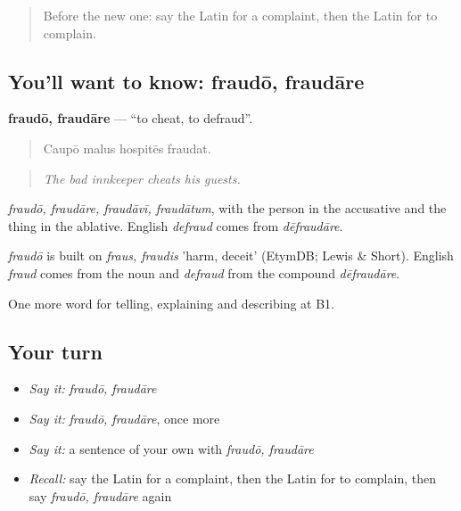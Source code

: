 \label{lesson:LA-C450-fraudo}



\begin{quote}
Before the new one: say the Latin for a complaint, then the Latin for to complain.
\end{quote}

\subsection*{You'll want to know: fraudō, fraudāre}
\textbf{fraudō, fraudāre} — \textquotedblleft{}to cheat, to defraud\textquotedblright{}.

\begin{quote}
Caupō malus hospitēs fraudat.
\end{quote}

\begin{quote}
\emph{The bad innkeeper cheats his guests.}
\end{quote}

\emph{fraudō, fraudāre, fraudāvī, fraudātum}, with the person in the accusative and the thing in the ablative. English \emph{defraud} comes from \emph{dēfraudāre}.

\begin{cousinweb}
\emph{fraudō} is built on \emph{fraus, fraudis} 'harm, deceit' (EtymDB; Lewis \& Short). English \emph{fraud} comes from the noun and \emph{defraud} from the compound \emph{dēfraudāre}.
\end{cousinweb}

\begin{grammarlens}[title={What you've built}]
One more word for telling, explaining and describing at B1.
\end{grammarlens}

\subsection*{Your turn}
\begin{itemize}
\raggedright
  \item \emph{Say it:} \emph{fraudō, fraudāre}
  \item \emph{Say it:} \emph{fraudō, fraudāre}, once more
  \item \emph{Say it:} a sentence of your own with \emph{fraudō, fraudāre}
  \item \emph{Recall:} say the Latin for a complaint, then the Latin for to complain, then say \emph{fraudō, fraudāre} again
\end{itemize}

